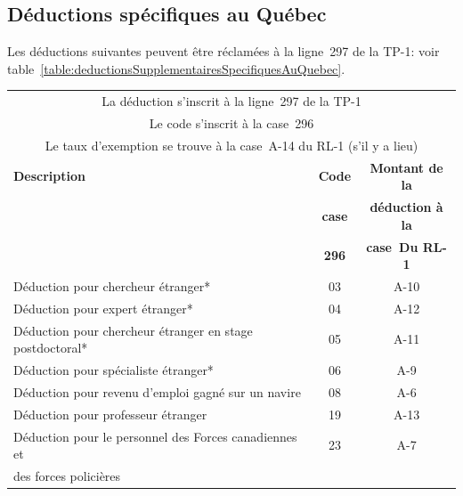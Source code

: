 \subsection{Déductions spécifiques au Québec}
Les déductions suivantes peuvent être réclamées à la ligne~297 de la TP-1: voir table~\ref{table:deductionsSupplementairesSpecifiquesAuQuebec}.
\begin{table}
	\centering
	\begin{tabular}{|l|c|c|}
		\hline
		\multicolumn{3}{|c|}{La déduction s'inscrit à la ligne~297 de la TP-1}                                      \\
		\multicolumn{3}{|c|}{Le code s'inscrit à la case~296}                                                       \\
		\multicolumn{3}{|c|}{Le taux d'exemption se trouve à la case~A-14 du RL-1 (s'il y a lieu)}                  \\ \hline
		\textbf{Description}                                     & \textbf{Code} &      \textbf{Montant de la}      \\
		                                                         & \textbf{case} &     \textbf{déduction à la}      \\
		                                                         & \textbf{296}  &      \textbf{case~Du RL-1}       \\ \hline
		Déduction pour chercheur étranger*                       &      03       &               A-10               \\ \hline
		Déduction pour expert étranger*                          &      04       &               A-12               \\ \hline
		Déduction pour chercheur étranger en stage postdoctoral* &      05       &               A-11               \\ \hline
		Déduction pour spécialiste étranger*                     &      06       &               A-9                \\ \hline
		Déduction pour revenu d'emploi gagné sur un navire       &      08       &               A-6                \\ \hline
		Déduction pour professeur étranger                       &      19       &               A-13               \\ \hline
		Déduction pour le personnel des Forces canadiennes et    &      23       &               A-7                \\
		des forces policières                                    &               &                                  \\ \hline

\end{tabular}
\end{table}
